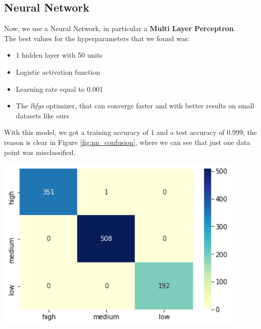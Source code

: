 \subsection{Neural Network}
\begin{minipage}{0.59\textwidth}
Now, we use a Neural Network, in particular a \textbf{Multi Layer Perceptron}.\\
The best values for the hyperparameters that we found was:
\begin{itemize}
\item 1 hidden layer with 50 units
\item Logistic activation function
\item Learning rate equal to 0.001
\item The \emph{lbfgs} optimizer, that can converge faster and with better results on small datasets like ours
\end{itemize}

With this model, we got a training accuracy of 1 and a test accuracy of 0.999; the reason is clear in Figure \ref{fig:nn_confusion}, where we can see that just one data point was misclassified.
\end{minipage}
\begin{minipage}{0.4\textwidth}
\centering
\includegraphics[width=0.90\textwidth]{img/classification/nn_confusion.png}
\captionsetup{justification=centering}
\label{fig:nn_confusion}
\end{minipage}

